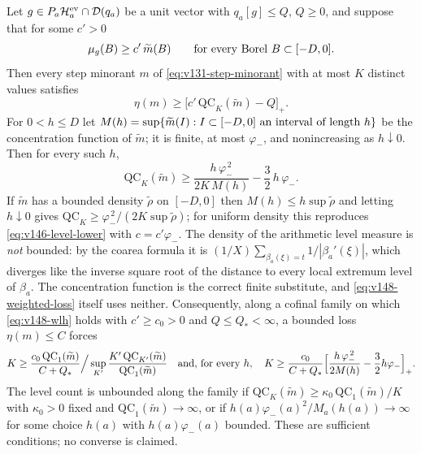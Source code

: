 \begin{proposition}
\label{prop:v148-weighted-levels}
Let $g\in P_a\mathcal H_a^{\rm ev}\cap\mathcal D(q_a)$ be a unit vector
with $q_a[g]\le Q$, $Q\ge0$, and suppose that for some $c'>0$
\begin{equation}\label{eq:v148-wlh}
 \mu_g(B)\ge c'\,\widetilde m(B)\qquad\hbox{for every Borel }B\subset[-D,0].
\end{equation}
Then every step minorant $m$ of \eqref{eq:v131-step-minorant} with at most
$K$ distinct values satisfies
\begin{equation}\label{eq:v148-weighted-loss}
 \eta(m)\ge\bigl[c'\,\mathrm{QC}_K(\widetilde m)-Q\bigr]_+ .
\end{equation}
For $0<h\le D$ let $M(h)=\sup\{\widetilde m(I):I\subset[-D,0]
\hbox{ an interval of length }h\}$ be the concentration function of
$\widetilde m$; it is finite, at most $\varphi_-$, and nonincreasing as
$h\downarrow0$. Then for every such $h$,
\begin{equation}\label{eq:v148-qc-lower}
 \mathrm{QC}_K(\widetilde m)\ge
 \frac{h\,\varphi_-^{\,2}}{2K\,M(h)}-\frac32\,h\,\varphi_- .
\end{equation}
If $\widetilde m$ has a bounded density $\widetilde\rho$ on $[-D,0]$ then
$M(h)\le h\sup\widetilde\rho$ and letting $h\downarrow0$ gives
$\mathrm{QC}_K\ge\varphi_-^{\,2}/(2K\sup\widetilde\rho)$; for uniform
density this reproduces \eqref{eq:v146-level-lower} with $c=c'\varphi_-$.
The density of the arithmetic level measure is \emph{not} bounded: by the
coarea formula it is $(1/X)\sum_{\beta_a(\xi)=t}1/|\beta_a'(\xi)|$, which
diverges like the inverse square root of the distance to every local
extremum level of $\beta_a$. The concentration function is the correct
finite substitute, and \eqref{eq:v148-weighted-loss} itself uses neither.
Consequently, along a cofinal family on which \eqref{eq:v148-wlh} holds
with $c'\ge c_0>0$ and $Q\le Q_*<\infty$, a bounded loss $\eta(m)\le C$
forces
\[
 K\ge\frac{c_0\,\mathrm{QC}_1(\widetilde m)}{C+Q_*}\Big/
     \sup_{K'}\frac{K'\,\mathrm{QC}_{K'}(\widetilde m)}{\mathrm{QC}_1(\widetilde m)}
 \quad\hbox{and, for every }h,\quad
 K\ge\frac{c_0}{C+Q_*}\Bigl[\frac{h\,\varphi_-^{\,2}}{2M(h)}-\frac32h\varphi_-\Bigr]_+ .
\]
The level count is unbounded along the family if
$\mathrm{QC}_K(\widetilde m)\ge\kappa_0\,\mathrm{QC}_1(\widetilde m)/K$
with $\kappa_0>0$ fixed and $\mathrm{QC}_1(\widetilde m)\to\infty$, or if
$h(a)\varphi_-(a)^2/M_a(h(a))\to\infty$ for some choice $h(a)$ with
$h(a)\varphi_-(a)$ bounded. These are sufficient conditions; no converse
is claimed.
\end{proposition}
